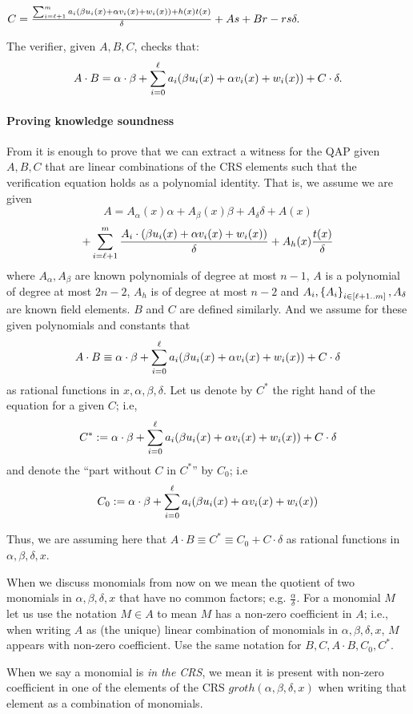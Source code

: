 \documentclass{article}
\begin{document}

$C=\frac{\sum_{i=\ell+1}^{m} a_i(\beta u_i(x)+\alpha v_i(x) +w_i(x))+h(x)t(x)}{\delta} + As + Br -rs\delta.$
  
The verifier, given $A,B,C$, checks that:
\[A\cdot B = \alpha\cdot \beta + \sum_{i=0}^\ell a_i( \beta u_i(x)+\alpha v_i(x) +w_i(x))+ C\cdot \delta.\]

\paragraph{Proving knowledge soundness}
From \cite{Groth16} it is enough to prove that we can extract a witness for the QAP given $A,B,C$ that are linear combinations of the CRS elements such that the
verification equation holds as a polynomial identity.
That is, we assume we are given 
\[A= A_\alpha(x)\alpha + A_{\beta}(x)\beta + A_\delta \delta + A(x)\]
\[+ \sum_{i=\ell+1}^{m}\frac{A_i\cdot (\beta u_i(x)+\alpha v_i(x) +w_i(x))}{\delta} + A_h(x)\frac{t(x)}{\delta}
\]
where $A_\alpha,A_\beta$ are known polynomials of degree at most $n-1$, $A$ is a polynomial of degree at most $2n-2$, $A_h$ is of degree at most $n-2$ and
$A_i,\left\{A_i\right\}_{i\in[\ell+1..m]}, A_\delta$ are known field elements.
$B$ and $C$ are defined similarly.
And we assume for these given polynomials and constants that
\[A\cdot B \equiv \alpha\cdot \beta + \sum_{i=0}^{\ell}a_i(\beta u_i(x)+\alpha v_i(x) +w_i(x))+  C\cdot \delta\]
as rational functions in $x,\alpha,\beta,\delta$.
Let us denote by $C^*$ the right hand of the equation for a given $C$;
i.e, 
\[C^* := \alpha\cdot \beta + \sum_{i=0}^{\ell}a_i(\beta u_i(x)+\alpha v_i(x) +w_i(x))+ C\cdot \delta\]
and denote the ``part without $C$ in $C^*$'' by $C_0$; i.e
\[C_0 := \alpha\cdot \beta + \sum_{i=0}^{\ell}a_i(\beta u_i(x)+\alpha v_i(x) +w_i(x))\]

Thus, we are assuming here that $A\cdot B \equiv C^*\equiv C_0 + C\cdot \delta$ as rational functions in $\alpha,\beta,\delta,x$.

When we discuss monomials from now on we mean the quotient of two monomials in $\alpha,\beta,\delta,x$ that have no common factors; e.g. $\frac{\alpha}{\delta}$.
For a monomial $M$ let us use the notation $M\in A$ to mean $M$ has a non-zero coefficient in $A$; i.e., when writing $A$ as (the unique) linear combination of monomials in $\alpha,\beta,\delta,x$, $M$ appears with non-zero coefficient.
Use the same notation for $B,C,A\cdot B, C_0, C^*$.

When we say a monomial is \emph{in the CRS}, we mean it is present with non-zero coefficient in one of the elements of the CRS $groth(\alpha,\beta,\delta,x)$ when writing that element as a combination of monomials.
\end{document}
